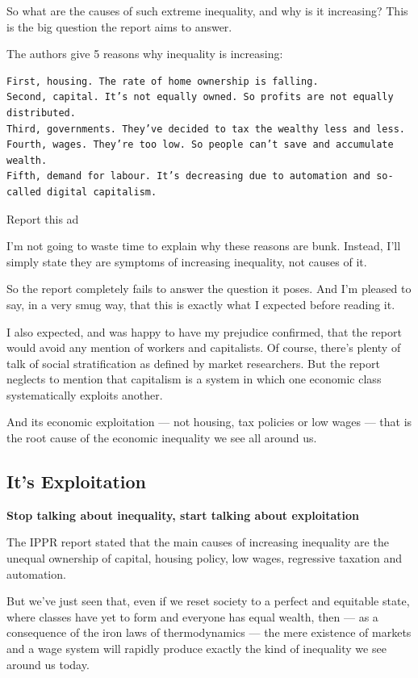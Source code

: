 \documentclass[
]{book}
\begin{document}
So what are the causes of such extreme inequality, and why is it increasing? This is the big question the report aims to answer.

The authors give 5 reasons why inequality is increasing:

\begin{verbatim}
First, housing. The rate of home ownership is falling.
Second, capital. It’s not equally owned. So profits are not equally distributed.
Third, governments. They’ve decided to tax the wealthy less and less.
Fourth, wages. They’re too low. So people can’t save and accumulate wealth.
Fifth, demand for labour. It’s decreasing due to automation and so-called digital capitalism.
\end{verbatim}

Report this ad

I'm not going to waste time to explain why these reasons are bunk. Instead, I'll simply state they are symptoms of increasing inequality, not causes of it.

So the report completely fails to answer the question it poses. And I'm pleased to say, in a very smug way, that this is exactly what I expected before reading it.

I also expected, and was happy to have my prejudice confirmed, that the report would avoid any mention of workers and capitalists. Of course, there's plenty of talk of social stratification as defined by market researchers. But the report neglects to mention that capitalism is a system in which one economic class systematically exploits another.

And its economic exploitation --- not housing, tax policies or low wages --- that is the root cause of the economic inequality we see all around us.

\hypertarget{its-exploitation}{%
\subsection{It's Exploitation}\label{its-exploitation}}

\textbf{Stop talking about inequality, start talking about exploitation}

The IPPR report stated that the main causes of increasing inequality are the unequal ownership of capital, housing policy, low wages, regressive taxation and automation.

But we've just seen that, even if we reset society to a perfect and equitable state, where classes have yet to form and everyone has equal wealth, then --- as a consequence of the iron laws of thermodynamics --- the mere existence of markets and a wage system will rapidly produce exactly the kind of inequality we see around us today.
\end{document}
